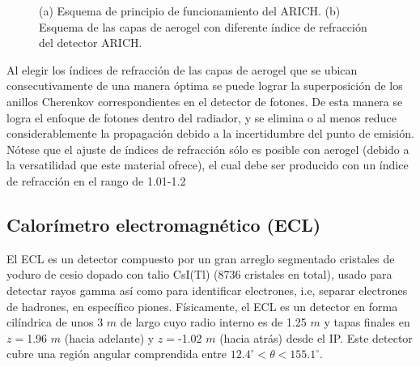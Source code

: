 \begin{figure}%
    \centering
    \qquad
    \caption{(a) Esquema de principio de funcionamiento del ARICH. (b) Esquema de las capas de aerogel con diferente índice de refracción del
detector ARICH. \cite{abe2010belle}}%
    \label{fig:arich}%
\end{figure}

Al elegir los índices de refracción de las capas de aerogel que se ubican consecutivamente de una manera óptima se puede lograr la superposición de los anillos Cherenkov correspondientes en el detector de fotones. De esta manera se logra el enfoque de fotones dentro del radiador, y se elimina o al menos reduce considerablemente la propagación debido a la incertidumbre del punto de emisión. Nótese que  el ajuste de índices de refracción sólo es posible con aerogel (debido a la versatilidad que este material ofrece), el cual debe ser producido con un índice de refracción en el rango de 1.01-1.2 \cite{abe2010belle}

\subsection{Calorímetro electromagnético (ECL)}

El ECL es un detector compuesto por un gran arreglo segmentado cristales de yoduro de cesio dopado con talio CsI(Tl) (8736 cristales en total), usado para detectar rayos gamma así como para identificar electrones, i.e, separar electrones de hadrones, en específico piones. Físicamente, el ECL es un detector en forma cilíndrica de unos 3 \(m\) de largo cuyo radio interno es de 1.25 \(m\) y tapas finales en \(z =\)1.96 \(m\) (hacia adelante) y \(z=\)-1.02 \(m\) (hacia atrás) desde el IP. Este detector cubre una región angular comprendida entre \(12.4^{\circ}<\theta<155.1^{\circ}\).

